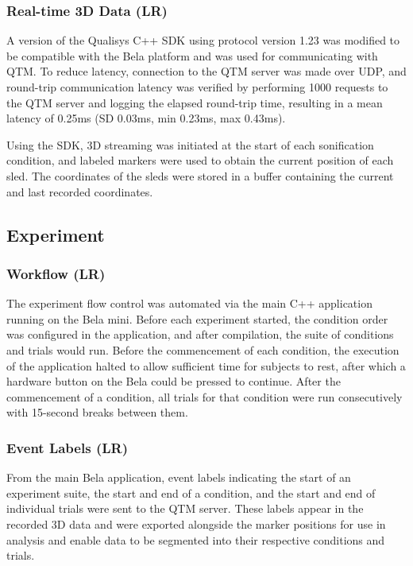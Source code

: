 \documentclass[10pt,a4paper,onecolumn]{article}
\begin{document}
\hypertarget{real-time-3d-data-lr}{%
\subsubsection{Real-time 3D Data (LR)}\label{real-time-3d-data-lr}}

A version of the Qualisys C++ SDK using protocol version 1.23 was modified to be compatible with the Bela platform and was used for communicating with QTM. To reduce latency, connection to the QTM server was made over UDP, and round-trip communication latency was verified by performing 1000 requests to the QTM server and logging the elapsed round-trip time, resulting in a mean latency of 0.25ms (SD 0.03ms, min 0.23ms, max 0.43ms).

Using the SDK, 3D streaming was initiated at the start of each sonification condition, and labeled markers were used to obtain the current position of each sled. The coordinates of the sleds were stored in a buffer containing the current and last recorded coordinates.

\hypertarget{experiment}{%
\subsection{Experiment}\label{experiment}}

\hypertarget{workflow-lr}{%
\subsubsection{Workflow (LR)}\label{workflow-lr}}

The experiment flow control was automated via the main C++ application running on the Bela mini. Before each experiment started, the condition order was configured in the application, and after compilation, the suite of conditions and trials would run. Before the commencement of each condition, the execution of the application halted to allow sufficient time for subjects to rest, after which a hardware button on the Bela could be pressed to continue. After the commencement of a condition, all trials for that condition were run consecutively with 15-second breaks between them.

\hypertarget{event-labels-lr}{%
\subsubsection{Event Labels (LR)}\label{event-labels-lr}}

From the main Bela application, event labels indicating the start of an experiment suite, the start and end of a condition, and the start and end of individual trials were sent to the QTM server. These labels appear in the recorded 3D data and were exported alongside the marker positions for use in analysis and enable data to be segmented into their respective conditions and trials.
\end{document}
